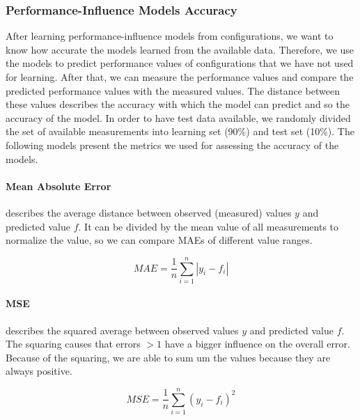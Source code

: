 \subsubsection{Performance-Influence Models Accuracy}
After learning performance-influence models from configurations, we want to know how accurate the models learned from the available data. Therefore, we use the models to predict performance values of configurations that we have not used for learning. After that, we can measure the performance values and compare the predicted performance values with the measured values. The distance between these values describes the accuracy with which the model can predict and so the accuracy of the model. In order to have test data available, we randomly divided the set of available measurements into learning set (90\%) and test set (10\%). The following models present the metrics we used for assessing the accuracy of the models. 

\paragraph{Mean Absolute Error} 
describes the average distance between observed (measured) values $y$ and predicted value $f$. It can be divided by the mean value of all measurements to normalize the value, so we can compare MAEs of different value ranges.

\begin{equation}
    \label{def:mea}
    MAE=\frac{1}{n}\sum_{i=1}^n|y_i-f_i|
\end{equation}

\paragraph{\ac{MSE}} 
describes the squared average between observed values $y$ and predicted value $f$. The squaring causes that errors $>1$ have a bigger influence on the overall error. Because of the squaring, we are able to sum um the values because they are always positive.

\begin{equation}
    \label{def:mse}
    MSE=\frac{1}{n}\sum_{i=1}^n(y_i-f_i)^2
\end{equation}

